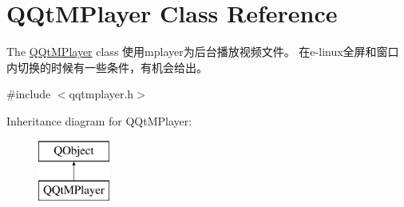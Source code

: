 \hypertarget{class_q_qt_m_player}{}\section{Q\+Qt\+M\+Player Class Reference}
\label{class_q_qt_m_player}


The \mbox{\hyperlink{class_q_qt_m_player}{Q\+Qt\+M\+Player}} class 使用mplayer为后台播放视频文件。 在e-\/linux全屏和窗口内切换的时候有一些条件，有机会给出。  




{\ttfamily \#include $<$qqtmplayer.\+h$>$}

Inheritance diagram for Q\+Qt\+M\+Player\+:\begin{figure}[H]
\begin{center}
\leavevmode
\includegraphics[height=2.000000cm]{class_q_qt_m_player}
\end{center}
\end{figure}
